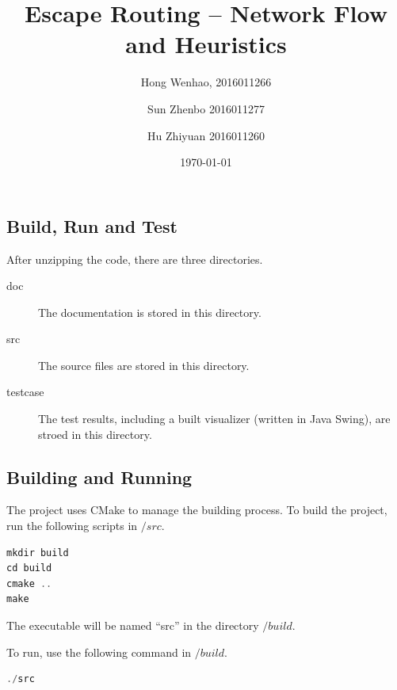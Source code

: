 \documentclass{article}
\title{\textmd{\bf Escape Routing -- Network Flow and Heuristics}}
\date{\today}
\author{Hong Wenhao, 2016011266
    \and
    Sun Zhenbo 2016011277
    \and
    Hu Zhiyuan 2016011260
}
\begin{document}
\begin{spacing}{1.1}
    \maketitle
    \newpage
    \tableofcontents
    \newpage
    \setcounter{section}{-1}

    \section{Build, Run and Test}
    After unzipping the code, there are three directories.
    \begin{description}
        \item [doc] The documentation is stored in this directory.
        \item [src] The source files are stored in this directory.
        \item [testcase] The test results, including a built visualizer (written in Java Swing), are stroed in this directory.
    \end{description}

    \subsection{Building and Running}
    The project uses CMake to manage the building process. To build the project, run the following scripts in $/src$.

    \begin{lstlisting}[language = c++]
mkdir build
cd build
cmake ..
make\end{lstlisting}
    The executable will be named ``src'' in the directory $/build$.

    To run, use the following command in $/build$.
    \begin{lstlisting}[language = c++]
./src\end{lstlisting}

\end{spacing}
\end{document}
